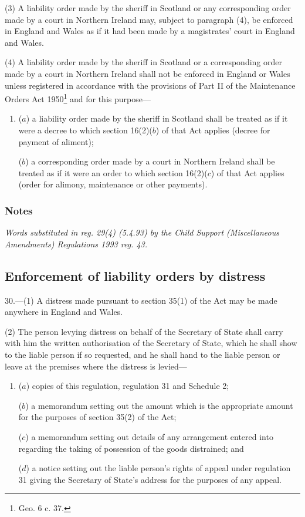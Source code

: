 \documentclass[a4paper]{article}
\newcommand\amendment[1]{\subsubsection*{Notes}{\itshape\frenchspacing\footnotesize #1 \par}}
\begin{document}
(3) A liability order made by the sheriff in Scotland or any corresponding order made by a court in Northern Ireland may, subject to paragraph (4), be enforced in England and Wales as if it had been made by a magistrates' court in England and Wales.

(4) A liability order made by the sheriff in Scotland or a corresponding order made by a court in Northern Ireland shall not be enforced in England or Wales unless registered in accordance with the provisions of 
Part II %
of the Maintenance Orders Act 1950\footnote{ Geo. 6 c. 37.} and for this purpose—
\begin{enumerate}\item[]
($a$) a liability order made by the sheriff in Scotland shall be treated as if it were a decree to which section 16(2)($b$) of that Act applies (decree for payment of aliment);

($b$) a corresponding order made by a court in Northern Ireland shall be treated as if it were an order to which section 16(2)($c$) of that Act applies (order for alimony, maintenance or other payments).
\end{enumerate}

\amendment{
Words substituted in reg. 29(4) (5.4.93) by the Child Support (Miscellaneous Amendments) Regulations 1993 reg. 43.
}

\subsection[30. Enforcement of liability orders by distress]{Enforcement of liability orders by distress}

30.—(1) A distress made pursuant to section 35(1) of the Act may be made anywhere in England and Wales.

(2) The person levying distress on behalf of the Secretary of State shall carry with him the written authorisation of the Secretary of State, which he shall show to the liable person if so requested, and he shall hand to the liable person or leave at the premises where the distress is levied—
\begin{enumerate}\item[]
($a$) copies of this regulation, regulation 31 and Schedule 2;

($b$) a memorandum setting out the amount which is the appropriate amount for the purposes of section 35(2) of the Act;

($c$) a memorandum setting out details of any arrangement entered into regarding the taking of possession of the goods distrained; and

($d$) a notice setting out the liable person’s rights of appeal under regulation 31 giving the Secretary of State’s address for the purposes of any appeal.
\end{enumerate}
\end{document}
